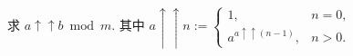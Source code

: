 求 \(a\uparrow\uparrow b\bmod m\). 其中 \(\displaystyle a\uparrow\uparrow n:=\begin{cases}
    1,                           & n=0, \\
    a^{a\uparrow\uparrow (n-1)}, & n>0.
\end{cases}\)
